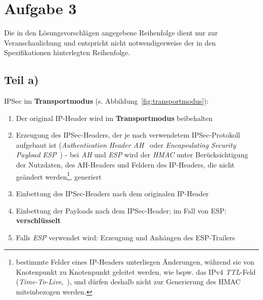 \chapter{Aufgabe 3}

\noindent
Die in den Lösungsvorschlägen angegebene Reihenfolge dient nur zur Veranschaulichung und entspricht nicht notwendigerweise der in den Spezifikationen hinterlegten Reihenfolge.

\section{Teil a)}
IPSec im \textbf{Transportmodus} (s. Abbildung~\ref{fig:transportmodus}):

\begin{enumerate}
    \itemsep0.5em
    \item Der original IP-Header wird im \textbf{Transportmodus} beibehalten
    \item Erzeugung des IPSec-Headers, der je nach verwendetem IPSec-Protokoll aufgebaut ist (\textit{Authentication Header AH}~\cite{RFC4302} oder \textit{Encapsulating Security Payload ESP}~\cite{RFC4303}) - bei \textit{AH} und \textit{ESP} wird der \textit{HMAC} unter Berücksichtigung der Nutzdaten, des AH-Headers und Feldern des IP-Headers, die nicht geändert werden\footnote{
    bestimmte Felder eines IP-Headers unterliegen Änderungen, während sie von Knotenpunkt zu Knotenpunkt geleitet werden, wie bspw. das IPv4 \textit{TTL}-Feld (\textit{Time-To-Live},~\cite[360 ff.]{KR14}), und dürfen deshalb nicht zur Generierung des HMAC miteinbezogen werden.
    }, generiert

    \item Einbettung des IPSec-Headers nach dem originalen IP-Header
    \item Einbettung der Payloads nach dem IPSec-Header; im Fall von ESP: \textbf{verschlüsselt}
    \item Falls \textit{ESP} verwendet wird: Erzeugung und Anhängen des ESP-Trailers
\end{enumerate}


